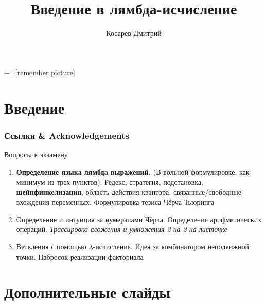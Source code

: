 \documentclass[aspectratio=169
  , xcolor={svgnames}
  , hyperref={colorlinks,citecolor=DeepPink4,linkcolor=DarkRed,urlcolor=DarkBlue}
  , russian  %
  ]{beamer}
\title[Введение в лямбда-исчисление]{Введение в лямбда-исчисление}
\author{Косарев Дмитрий}
\date{\DTMDate{2025-03-12}}
\begin{document}
\maketitle

+=[remember picture]

\everymath{\displaystyle}





\section*{Введение}


\begin{frame}%
\frametitle<presentation>{Ссылки \& Acknowledgements}
\vspace{-1.5em}
\printbibliography
\end{frame}


\begin{frame}{Вопросы к экзамену  }
\begin{enumerate}
	\item \textbf{Определение языка лямбда выражений.} (В вольной формулировке, как минимум из трех пунктов). Редекс, стратегия, подстановка, \textbf{шейнфинкелизация}, область действия квантора, связанные/свободные вхождения переменных. Формулировка тезиса Чёрча-Тьюринга
	\item Определение и интуиция за нумералами Чёрча. Определение арифметических операций. \textit{Трассировка сложения и умножения 2 на 2 на листочке}
	\item Ветвления с помощью $\lambda$-исчисления. Идея за комбинатором неподвижной точки. Набросок реализации факториала

\end{enumerate}
\end{frame}

\appendix

\section{Дополнительные слайды}




\end{document}
